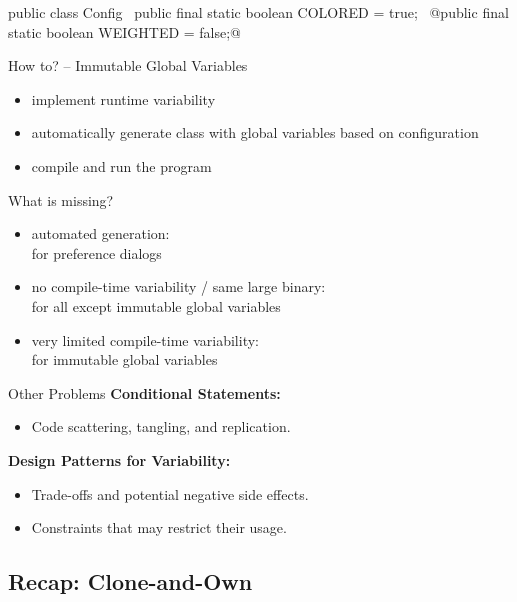 \begin{frame}[fragile]{\myframetitle}
	\begin{mycolumns}[widths={48}]
\begin{codetight}[basicstyle=\small]{}
public class Config {
	~public final static boolean COLORED = true;~
	@public final static boolean WEIGHTED = false;@
}
\end{codetight}
		\begin{definition}{How to? -- Immutable Global Variables}
			\begin{itemize}
				\item implement runtime variability
				\item automatically generate class with global variables based on configuration
				\item compile and run the program
			\end{itemize}
		\end{definition}
	\mynextcolumn
		\begin{note}{What is missing?}
			\begin{itemize}
				\item automated generation:\\\hfill for preference dialogs
				\item no compile-time variability / same large binary:\\\hfill for all except immutable global variables
				\item very limited compile-time variability:\\\hfill for immutable global variables
			\end{itemize}
		\end{note}
		\begin{note}{Other Problems}
			{\bf Conditional Statements:}
			\begin{itemize}
				\item Code scattering, tangling, and replication.
			\end{itemize}	
			{\bf Design Patterns for Variability:}
			\begin{itemize}
				\item Trade-offs and potential negative side effects.
				\item Constraints that may restrict their usage.
			\end{itemize}
		\end{note}
	\end{mycolumns}
\end{frame}

\subsection{Recap: Clone-and-Own}

